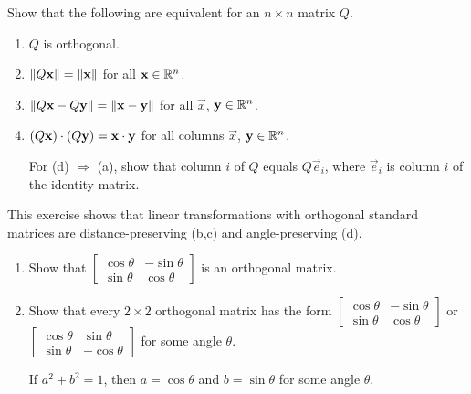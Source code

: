 \documentclass{ximera}
\begin{document}
\begin{problem}\label{prob:ortho25}
Show that the following are equivalent for an $n \times n$ matrix $Q$.


\begin{enumerate} 
\item $Q$ is orthogonal.

\item $\left\lVert Q\mathbf{x}\right\rVert = \left\lVert\mathbf{x}\right\rVert$ for all $\mathbf{x}\in\mathbb{R}^n$.

\item $\left\lVert Q\mathbf{x} - Q\mathbf{y}\right\rVert = \left\lVert\mathbf{x} - \mathbf{y}\right\rVert$ for all $\vec{x}$, $\mathbf{y}\in \mathbb{R}^n$.

\item $(Q\mathbf{x}) \cdot (Q\mathbf{y}) = \mathbf{x} \cdot \mathbf{y}$ for all columns $\vec{x}$, $\mathbf{y}\in\mathbb{R}^n$.

\begin{hint}
For (d) $\Rightarrow$ (a), show that column $i$ of $Q$ equals $Q\vec{e}_{i}$, where $\vec{e}_{i}$ is column $i$ of the identity matrix.
\end{hint}
\end{enumerate}
\begin{remark}
    This exercise shows that linear transformations with orthogonal standard matrices are distance-preserving (b,c) and angle-preserving (d).
\end{remark}

\end{problem}



\begin{problem}\label{prob:rotation_ortho}
\begin{enumerate}
    \item Show that $\begin{bmatrix}
\cos\theta & -\sin\theta \\
\sin\theta & \cos\theta
\end{bmatrix}$ is an orthogonal matrix.

    \item Show that every $2 \times 2$ orthogonal matrix has the form $\begin{bmatrix}
\cos\theta & -\sin\theta \\
\sin\theta & \cos\theta
\end{bmatrix}$ or $\begin{bmatrix}
\cos\theta & \sin\theta \\
\sin\theta & -\cos\theta
\end{bmatrix}$
 for some angle $\theta$.
 \begin{hint}
 If $a^{2} + b^{2} = 1$, then $a = \cos\theta$ and $b = \sin\theta$ for some angle $\theta$.
 \end{hint}
\end{enumerate}

\end{problem}
\end{document}
